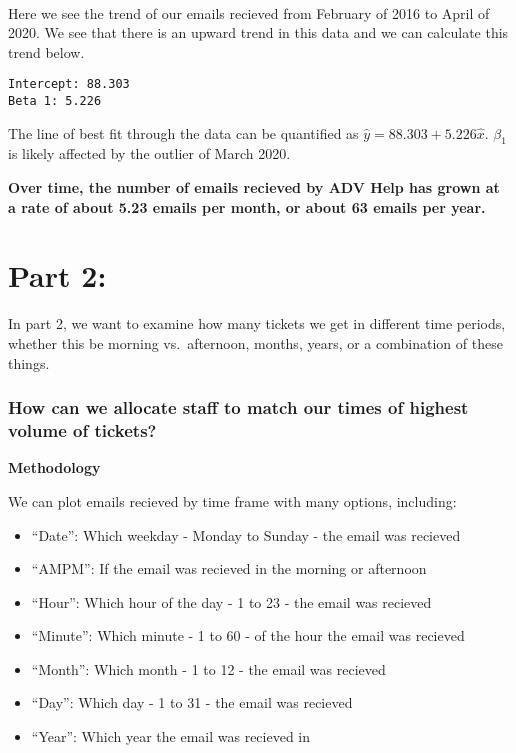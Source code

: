 \documentclass[11pt]{article}
\providecommand{\tightlist}{%
      \setlength{\itemsep}{0pt}\setlength{\parskip}{0pt}}
\begin{document}
    \begin{center}
    \end{center}
    { \hspace*{\fill} \\}
    
    Here we see the trend of our emails recieved from February of 2016 to
April of 2020. We see that there is an upward trend in this data and we
can calculate this trend below.

    \begin{Verbatim}[commandchars=\\\{\}]
Intercept: 88.303
Beta 1: 5.226
    \end{Verbatim}

    The line of best fit through the data can be quantified as
\(\hat{y} = 88.303 + 5.226\hat{x}\). \(\beta_1\) is likely affected by
the outlier of March 2020.

\textbf{Over time, the number of emails recieved by ADV Help has grown
at a rate of about 5.23 emails per month, or about 63 emails per year.}

    \hypertarget{part-2}{%
\section{Part 2:}\label{part-2}}

In part 2, we want to examine how many tickets we get in different time
periods, whether this be morning vs.~afternoon, months, years, or a
combination of these things.

\hypertarget{how-can-we-allocate-staff-to-match-our-times-of-highest-volume-of-tickets}{%
\subsubsection{How can we allocate staff to match our times of highest
volume of
tickets?}\label{how-can-we-allocate-staff-to-match-our-times-of-highest-volume-of-tickets}}



    \textbf{Methodology}

We can plot emails recieved by time frame with many options, including:

\begin{itemize}
\tightlist
\item
  ``Date'': Which weekday - Monday to Sunday - the email was recieved
\item
  ``AMPM'': If the email was recieved in the morning or afternoon
\item
  ``Hour'': Which hour of the day - 1 to 23 - the email was recieved
\item
  ``Minute'': Which minute - 1 to 60 - of the hour the email was
  recieved
\item
  ``Month'': Which month - 1 to 12 - the email was recieved
\item
  ``Day'': Which day - 1 to 31 - the email was recieved
\item
  ``Year'': Which year the email was recieved in
\end{itemize}
\end{document}
